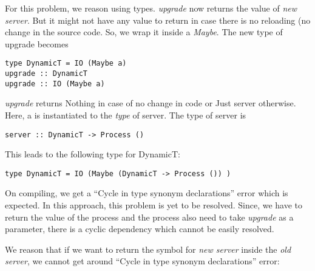 For this problem, we reason using types. \emph{upgrade} now returns
the value of \emph{new server}. But it might not have any value to
return in case there is no reloading (no change in the source
code. So, we wrap it inside a \emph{Maybe}. The new type of upgrade
becomes
\begin{verbatim}
type DynamicT = IO (Maybe a)
upgrade :: DynamicT
upgrade :: IO (Maybe a)
\end{verbatim}
\emph{upgrade} returns Nothing in case of no change in code or Just
server otherwise. Here, a is instantiated to the \emph{type} of
server. The type of server is
\begin{verbatim}
server :: DynamicT -> Process ()
\end{verbatim}
This leads to the following type for DynamicT:
\begin{verbatim}
type DynamicT = IO (Maybe (DynamicT -> Process ()) )
\end{verbatim}

On compiling, we get a ``Cycle in type synonym declarations'' error
which is expected. In this approach, this problem is yet to be
resolved. Since, we have to return the value of the process and the
process also need to take \emph{upgrade} as a parameter, there is a
cyclic dependency which cannot be easily resolved.

We reason that if we want to return the symbol for \emph{new server}
inside the \emph{old server}, we cannot get around ``Cycle in type
synonym declarations'' error:

